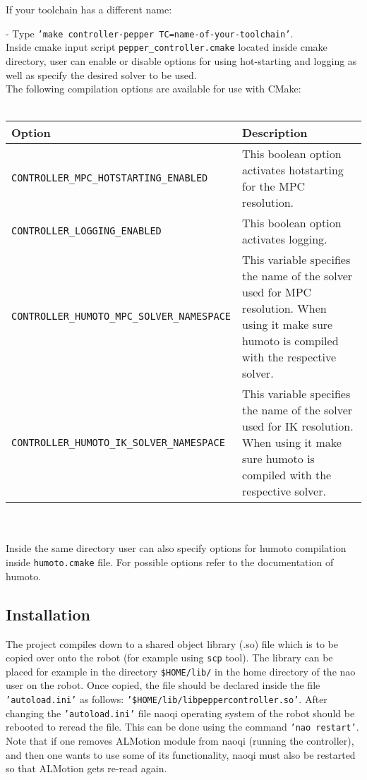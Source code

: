 \noindent If your toolchain has a different name:

- Type \texttt{'make controller-pepper TC=name-of-your-toolchain'}.\\

\noindent Inside cmake input script \texttt{pepper\_controller.cmake} located inside cmake directory, user can enable or disable
options for using hot-starting and logging as well as specify the desired solver to be used.\\

\noindent The following compilation options are available for use with CMake:\\ \\
\begin{tabular}{|l|p{5cm}|}
\hline
Option & Description \\
\hline
\texttt{CONTROLLER\_MPC\_HOTSTARTING\_ENABLED} & This boolean option activates hotstarting for the MPC resolution.\\
\hline
\texttt{CONTROLLER\_LOGGING\_ENABLED} & This boolean option activates logging.\\ \hline
\texttt{CONTROLLER\_HUMOTO\_MPC\_SOLVER\_NAMESPACE} & This variable specifies the name of the solver used for
MPC resolution. When using it make sure humoto is compiled with the respective solver. \\ \hline
\texttt{CONTROLLER\_HUMOTO\_IK\_SOLVER\_NAMESPACE} & This variable specifies the name of the solver used for IK
resolution. When using it make sure humoto is compiled with the respective solver.\\ 
\hline
\end{tabular} \\ \\

\noindent Inside the same directory user can also specify options for humoto compilation inside \texttt{humoto.cmake} file.
For possible options refer to the documentation of humoto.

\subsection{Installation}
\noindent The project compiles down to a shared object library (.so) file which is to be copied over onto the robot (for example
using \texttt{scp} tool). The library can be placed for example in the directory \texttt{\$HOME/lib/} in the home directory of the nao user on the
robot. Once copied, the file should be declared inside the file \texttt{'autoload.ini'} as follows:
\texttt{'\$HOME/lib/libpeppercontroller.so'}. After changing the \texttt{'autoload.ini'} file naoqi operating system of the robot should be
rebooted to reread the file. This can be done using the command \texttt{'nao restart'}. Note that if one removes ALMotion
module from naoqi (running the controller), and then one wants to use some of its functionality, naoqi must also be
restarted so that ALMotion gets re-read again.  

